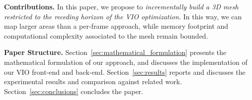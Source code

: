 {\bf Contributions.}
In this paper, we propose to \emph{incrementally build a 3D mesh restricted to the receding horizon of the VIO optimization.}
In this way, we can map larger areas than a per-frame approach, while memory footprint and computational complexity associated to the mesh remain bounded.

{\bf Paper Structure.}
Section~\ref{sec:mathematical_formulation} presents the mathematical formulation of our approach, and discusses the implementation of %
our VIO front-end and back-end. %
Section~\ref{sec:results} reports and discusses the experimental results and comparison against related work. Section~\ref{sec:conclusions} concludes the paper.
